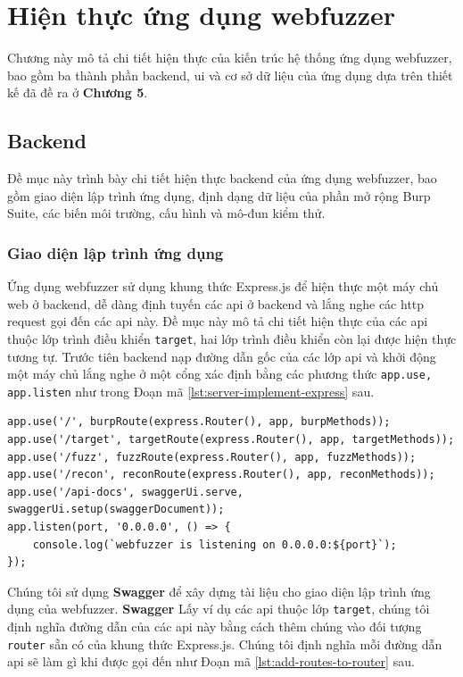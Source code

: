 \chapter{Hiện thực ứng dụng webfuzzer}
Chương này mô tả chi tiết hiện thực của kiến trúc hệ thống ứng dụng webfuzzer, bao gồm ba thành phần backend, \acrshort{ui} và cơ sở dữ liệu của ứng dụng dựa trên thiết kế đã đề ra ở \textbf{Chương 5}.
\section{Backend}
Đề mục này trình bày chi tiết hiện thực backend của ứng dụng webfuzzer, bao gồm giao diện lập trình ứng dụng, định dạng dữ liệu của phần mở rộng Burp Suite, các biến môi trường, cấu hình và mô-đun kiểm thử.
\subsection{Giao diện lập trình ứng dụng}
Ứng dụng webfuzzer sử dụng khung thức Express.js để hiện thực một máy chủ web ở backend, dễ dàng định tuyến các \acrshort{api} ở backend và lắng nghe các \acrshort{http} request gọi đến các \acrshort{api} này. Đề mục này mô tả chi tiết hiện thực của các \acrshort{api} thuộc lớp trình điều khiển \texttt{target}, hai lớp trình điều khiển còn lại được hiện thực tương tự. Trước tiên backend nạp đường dẫn gốc của các lớp \acrshort{api} và khởi động một máy chủ lắng nghe ở một cổng xác định bằng các phương thức \texttt{app.use, app.listen} như trong Đoạn mã \ref{lst:server-implement-express} sau.
\begin{lstlisting}[style=ES6, label={lst:server-implement-express}, caption={Thiết lập đường dẫn gốc của các \acrshort{api} và khởi động backend}]
app.use('/', burpRoute(express.Router(), app, burpMethods));
app.use('/target', targetRoute(express.Router(), app, targetMethods));
app.use('/fuzz', fuzzRoute(express.Router(), app, fuzzMethods));
app.use('/recon', reconRoute(express.Router(), app, reconMethods));
app.use('/api-docs', swaggerUi.serve, swaggerUi.setup(swaggerDocument));
app.listen(port, '0.0.0.0', () => {
    console.log(`webfuzzer is listening on 0.0.0.0:${port}`);
});
\end{lstlisting}
Chúng tôi sử dụng \textbf{Swagger} để xây dựng tài liệu cho giao diện lập trình ứng dụng của webfuzzer. \textbf{Swagger} 
Lấy ví dụ các \acrshort{api} thuộc lớp \texttt{target}, chúng tôi định nghĩa đường dẫn của các \acrshort{api} này bằng cách thêm chúng vào đối tượng \texttt{router} sẵn có của khung thức Express.js. Chúng tôi định nghĩa mỗi đường dẫn \acrshort{api} sẽ làm gì khi được gọi đến như Đoạn mã \ref{lst:add-routes-to-router} sau.

